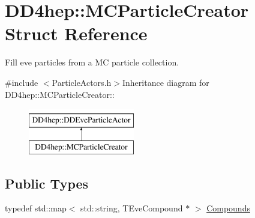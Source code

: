 \hypertarget{struct_d_d4hep_1_1_m_c_particle_creator}{
\section{DD4hep::MCParticleCreator Struct Reference}
\label{struct_d_d4hep_1_1_m_c_particle_creator}
}


Fill eve particles from a MC particle collection.  


{\ttfamily \#include $<$ParticleActors.h$>$}Inheritance diagram for DD4hep::MCParticleCreator::\begin{figure}[H]
\begin{center}
\leavevmode
\includegraphics[height=2cm]{struct_d_d4hep_1_1_m_c_particle_creator}
\end{center}
\end{figure}
\subsection*{Public Types}
\begin{DoxyCompactItemize}
\item 
typedef std::map$<$ std::string, TEveCompound $\ast$ $>$ \hyperlink{struct_d_d4hep_1_1_m_c_particle_creator_a803ff0bb27e3c5cd40daf4d253eb2b62}{Compounds}
\end{DoxyCompactItemize}
